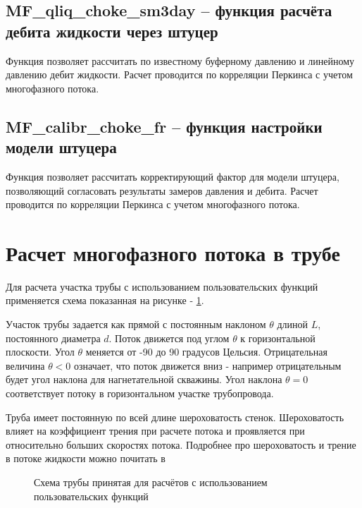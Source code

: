 \subsection{MF\_qliq\_choke\_sm3day – функция расчёта дебита жидкости через штуцер}
Функция позволяет рассчитать по известному буферному давлению и линейному давлению дебит жидкости. Расчет проводится по корреляции Перкинса \cite{Perkins_1993} с учетом многофазного потока.  



\subsection{MF\_calibr\_choke\_fr – функция настройки модели штуцера}
Функция позволяет рассчитать корректирующий фактор для модели штуцера, позволяющий согласовать результаты замеров давления и дебита. Расчет проводится по корреляции Перкинса \cite{Perkins_1993} с учетом многофазного потока.  


\newpage
\section{Расчет многофазного потока в трубе}

Для расчета участка трубы с использованием пользовательских функций \unf{} применяется схема показанная на рисунке - \ref{ris:Pipe_scheme_1}.

Участок трубы задается как прямой с постоянным наклоном $\theta$  длиной $L$, постоянного диаметра $d$. Поток движется под углом $\theta$ к горизонтальной плоскости. Угол  $\theta$ меняется от -90 до 90 градусов Цельсия. Отрицательная величина  $\theta < 0 $ означает, что поток движется вниз - например отрицательным будет угол наклона для нагнетательной скважины. Угол наклона $\theta = 0 $ соответствует потоку в горизонтальном участке трубопровода.

Труба имеет постоянную по всей длине шероховатость стенок. Шероховатость влияет на коэффициент трения при расчете потока и проявляется при относительно больших скоростях потока. Подробнее про шероховатость и трение в потоке жидкости можно почитать в \cite{Bratland_Pipe_Flow_1}

\begin{figure}[h!]
	\begin{center}
		
		\caption{Схема трубы принятая для расчётов с использованием пользовательских функций}
		\label{ris:Pipe_scheme_1}
	\end{center}
\end{figure}

